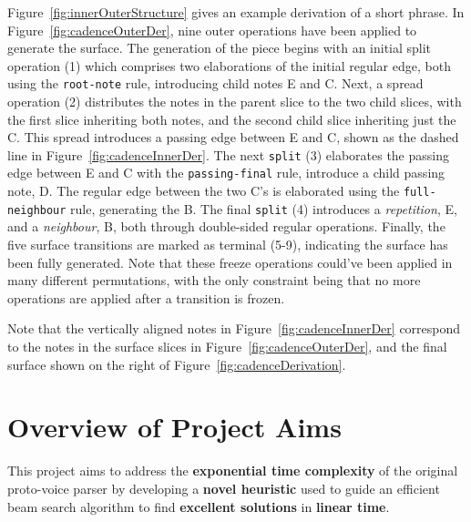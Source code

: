 \documentclass[12pt,a4paper,twoside,openany]{report} \usepackage[pdfborder={0 0 0}]{hyperref}    %
\theoremstyle{definition} \newtheorem{definition}{Definition}[section]
\begin{document}
Figure~\ref{fig:innerOuterStructure} gives an example derivation of a short phrase. 
In Figure~\ref{fig:cadenceOuterDer}, nine outer operations have been applied to generate the surface.
The generation of the piece begins with an initial split operation (1) which comprises two elaborations of the initial
regular edge, both using the \texttt{root-note} rule, introducing child notes E and C. 
Next, a spread operation (2) distributes the notes in the parent slice to the two child slices, with the first slice inheriting both notes, and the second child slice inheriting just the C. 
This spread introduces a passing edge between E and C, shown as the dashed line in Figure~\ref{fig:cadenceInnerDer}. 
The next \texttt{split} (3) elaborates the passing edge between E and
C with the \texttt{passing-final} rule,
introduce a child passing note, D. The regular edge between the two C's is elaborated using the
\texttt{full-neighbour} rule, generating the B. The final \texttt{split} (4) introduces a \textit{repetition}, E, and
a \textit{neighbour}, B, both through double-sided regular operations. Finally, the five surface transitions are marked
as terminal (5-9), indicating the surface has been fully generated. Note that these freeze operations could've been
applied in many different permutations, with the only constraint being that no more operations are applied after a transition is frozen.

Note that the vertically aligned notes in Figure~\ref{fig:cadenceInnerDer}
correspond to the notes in the surface slices in Figure~\ref{fig:cadenceOuterDer}, and the final surface shown on the
right of Figure~\ref{fig:cadenceDerivation}. 


\section{Overview of Project Aims} %
\label{sec:protoVoiceParser}
This project aims to address the \textbf{exponential time complexity} of the original proto-voice parser by developing
a \textbf{novel heuristic} used to guide an efficient beam search algorithm to find \textbf{excellent solutions} in
\textbf{linear time}.
\end{document}

